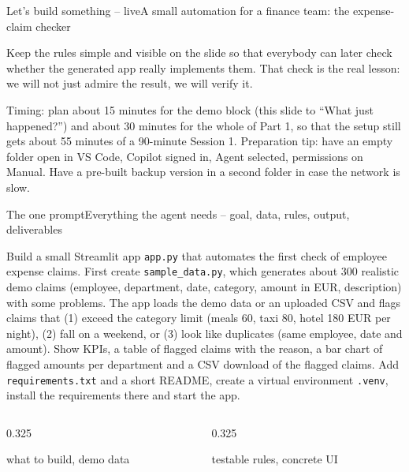 \documentclass[aspectratio=169,11pt]{beamer}
\begin{document}
\begin{frame}{Let's build something -- live}{A small automation for a finance team: the expense-claim checker}
{  Keep the rules simple and visible on the slide so that everybody can later check whether the generated app really implements them. That check is the real lesson: we will not just admire the result, we will verify it.\par
  Timing: plan about 15 minutes for the demo block (this slide to ``What just happened?'') and about 30 minutes for the whole of Part 1, so that the setup still gets about 55 minutes of a 90-minute Session 1. Preparation tip: have an empty folder open in VS Code, Copilot signed in, Agent selected, permissions on Manual. Have a pre-built backup version in a second folder in case the network is slow.}
\end{frame}

\begin{frame}{The one prompt}{Everything the agent needs -- goal, data, rules, output, deliverables}
  \begin{promptbox}
    Build a small Streamlit app \texttt{app.py} that automates the first check of employee expense claims.
    First create \texttt{sample\_data.py}, which generates about 300 realistic demo claims (employee, department, date, category, amount in EUR, description) with some problems.
    The app loads the demo data or an uploaded CSV and flags claims that (1) exceed the category limit (meals 60, taxi 80, hotel 180 EUR per night), (2) fall on a weekend, or (3) look like duplicates (same employee, date and amount).
    Show KPIs, a table of flagged claims with the reason, a bar chart of flagged amounts per department and a CSV download of the flagged claims.
    Add \texttt{requirements.txt} and a short README, create a virtual environment \texttt{.venv}, install the requirements there and start the app.
  \end{promptbox}
  \vspace{5pt}
  \begin{columns}[T,onlytextwidth]
    \begin{column}{0.325\textwidth}\begin{infobox}what to build, demo data\strut\end{infobox}\end{column}
    \begin{column}{0.325\textwidth}\begin{infobox}testable rules, concrete UI\strut\end{infobox}\end{column}

\end{columns}
\end{frame}
\end{document}
